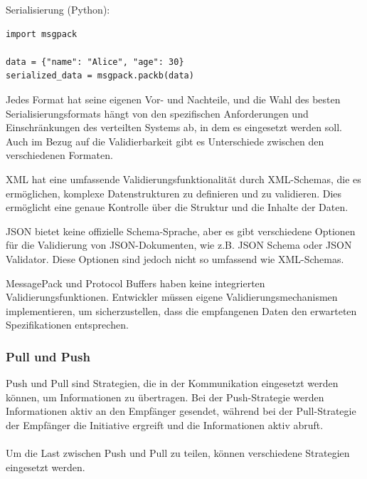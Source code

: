 \documentclass[../vs-script-first-v01.tex]{subfiles}
\begin{document}
Serialisierung (Python):\\
\begin{lstlisting}[caption={MessagePack},captionpos=b,label={lst:msgpack}]
import msgpack

data = {"name": "Alice", "age": 30}
serialized_data = msgpack.packb(data)
\end{lstlisting}
Jedes Format hat seine eigenen Vor- und Nachteile, und die Wahl des besten Serialisierungsformats hängt von den spezifischen Anforderungen und Einschränkungen des verteilten Systems ab, in dem es eingesetzt werden soll.
Auch im Bezug auf die Validierbarkeit gibt es Unterschiede zwischen den verschiedenen Formaten.

XML hat eine umfassende Validierungsfunktionalität durch XML-Schemas, die es ermöglichen, komplexe Datenstrukturen zu definieren und zu validieren. Dies ermöglicht eine genaue Kontrolle über die Struktur und die Inhalte der Daten.

JSON bietet keine offizielle Schema-Sprache, aber es gibt verschiedene Optionen für die Validierung von JSON-Dokumenten, wie z.B. JSON Schema oder JSON Validator. Diese Optionen sind jedoch nicht so umfassend wie XML-Schemas.

MessagePack und Protocol Buffers haben keine integrierten Validierungsfunktionen. Entwickler müssen eigene Validierungsmechanismen implementieren, um sicherzustellen, dass die empfangenen Daten den erwarteten Spezifikationen entsprechen.

\subsubsection{Pull und Push}

Push und Pull sind Strategien, die in der Kommunikation eingesetzt werden können, um Informationen zu übertragen. Bei der Push-Strategie werden Informationen aktiv an den Empfänger gesendet, während bei der Pull-Strategie der Empfänger die Initiative ergreift und die Informationen aktiv abruft.
\\\\
Um die Last zwischen Push und Pull zu teilen, können verschiedene Strategien eingesetzt werden. 
\end{document}
